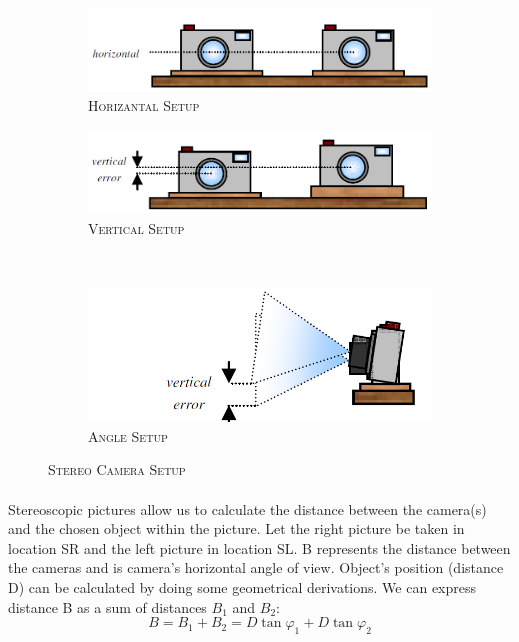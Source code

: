 \begin{figure}[!h]
	\begin{subfigure}[b]{0.4\textwidth}
		\centering
		\includegraphics[width=1.3\textwidth,scale=2]{project/images/a.png}
		\caption{\textsc{Horizantal Setup}}
		\label{fig:3}
	\end{subfigure}
	\hspace{2cm}
	\begin{subfigure}[b]{0.4\textwidth}
		\centering
		\includegraphics[width=1.3\textwidth]{project/images/b.png}
		\caption{\textsc{Vertical Setup}}
		\label{fig:4}
	\end{subfigure}\\
	\hspace{3cm}
\begin{subfigure}[b]{0.4\textwidth}
	\vspace{1cm}
	
	\centering
	\includegraphics[width=1.3\textwidth]{project/images/c.png}
	\caption{\textsc{Angle Setup}}
	\label{fig:5}
\end{subfigure}
	\caption{\textsc{Stereo Camera Setup}}
\end{figure}
\paragraph{} Stereoscopic pictures allow us to calculate the distance between the camera(s) and the chosen object within the picture. Let the right picture be taken in location SR and the left picture in location SL. B represents the distance between the cameras and is camera’s horizontal angle of view. Object’s position (distance D) can be calculated by doing some geometrical derivations.
We can express distance B as a sum of distances $ B_{1} $ and $ B_{2} $:
\begin{equation}
B=B_{1}+B_{2}= D\tan\varphi_{1}+D\tan\varphi_{2}
\end{equation}
